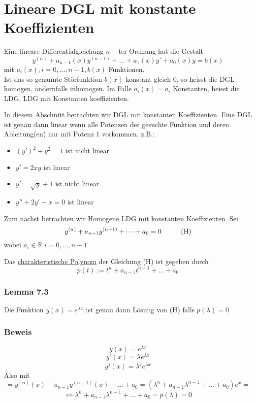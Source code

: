 \section{Lineare DGL mit konstante Koeffizienten} 

\begin{definition}{7.1}
Eine lineare Differentialgleichung $n-$ter Ordnung hat die Gestalt \[{y^{(n)}} + {a_{n - 1}}(x){y^{(n - 1)}} +  \ldots  + {a_1}(x)y' + {a_0}(x)y = b(x)\] mit $a_i(x),i=0,\dots,n-1, b(x)$ Funktionen. \\

Ist das so genannte Störfunktion $b(x)$ konstant gleich 0, so heisst die DGL homogen, andernfalls inhomogen. Im Falle $a_i(x)=a_i$ Konstanten, heisst die LDG, LDG mit Konstanten koeffizienten. 
\end{definition}

In diesem Abschnitt betrachten wir DGL mit konstanten Koeffizienten. Eine DGL ist genau dann linear wenn alle Potenzen der gesuchte Funktion und deren Ableitung(en) nur mit Potenz 1 vorkommen.
z.B.:
\begin{itemize}
\item $\left( y'\right)^2+y^2=1$ ist nicht linear
\item $y'=2xy$ ist linear
\item $y'=\sqrt{y}+1$ ist nicht linear
\item $y''+2y'+x=0$ ist linear
\end{itemize}

\noindent Zum nächst betrachten wir Homogene LDG mit konstanten Koeffizienten. Sei \[y^{(n)}+a_{n-1}y^{(n-1)}+\dots+a_0=0\text{\hspace{10mm}(H)}\] wobei $a_i\in\mathbb{R}$ $i=0,\dots,n-1$
\begin{definition}{7.2}
Das \underline{charakteristische Polynom} der Gleichung (H) ist gegeben durch \[p(t):=t^n+a_{n-1}t^{n-1}+\dots+a_0\]
\end{definition} 
\subsubsection*{Lemma 7.3}
Die Funktion $y(x)=e^{\lambda x}$ ist genau dann Lösung von (H) falls $p(\lambda)=0$ 
\subsubsection*{Beweis}
\[y(x)=e^{\lambda x}\]
\[y'(x)=\lambda e^{\lambda x}\]
\[y^j(x)=\lambda ^je^{\lambda x}\]
Also mit \[=y^{(n)}(x)+a_{n-1}y^{(n-1)}(x)+\dots+a_0=(\lambda ^n+a_{n-1}\lambda ^{n-1}+\dots +a_0)e^x=\]
\[\Leftrightarrow \lambda^n+a_{n-1}\lambda^{n-1}+\dots +a_0=p(\lambda)=0\]


